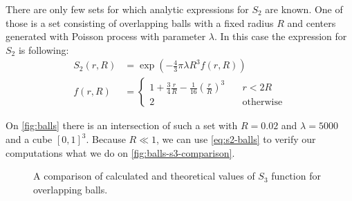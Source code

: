 \documentclass[1p]{elsarticle}
\begin{document}
There are only few sets for which analytic expressions for $S_2$ are known. One
of those is a set consisting of overlapping balls with a fixed radius $R$ and
centers generated with Poisson process with parameter $\lambda$. In this case
the expression for $S_2$ is following:
\begin{equation}
  \begin{aligned}
    S_2(r, R) &= \exp(-\frac{4}{3}\pi\lambda R^3 f(r, R)) \\
    f(r, R) &= \left\{
    \begin{array}{ll}
      1 + \frac{3}{4} \frac{r}{R} - \frac{1}{16} (\frac{r}{R})^3 & \quad r < 2R \\
      2 & \quad \text{otherwise}
    \end{array}
    \right.
  \end{aligned}
  \label{eq:s2-balls}
\end{equation}

On \cref{fig:balls} there is an intersection of such a set with $R = 0.02$ and
$\lambda=5000$ and a cube $[0, 1]^3$. Because $R \ll 1$, we can use
\cref{eq:s2-balls} to verify our computations what we do on
\cref{fig:balls-s3-comparison}.
\begin{figure}[tp]
  \centering
  \hfill
  \caption[]{A comparison of calculated and theoretical values of $S_3$ function
    for overlapping balls.}
  \label{fig:s3-verification}
\end{figure}
\end{document}
